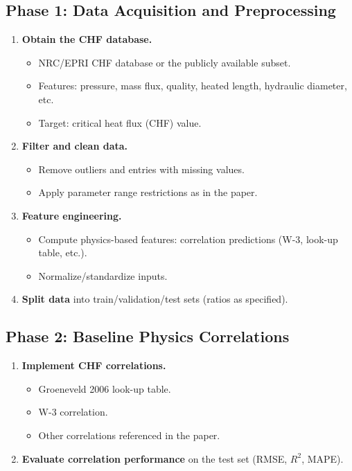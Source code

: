 \documentclass[11pt,a4paper]{article}
\begin{document}
\subsection{Phase 1: Data Acquisition and Preprocessing}
\begin{enumerate}[label=\textbf{1.\arabic*}]
  \item \textbf{Obtain the CHF database.}
    \begin{itemize}
      \item NRC/EPRI CHF database or the publicly available subset.
      \item Features: pressure, mass flux, quality, heated length, hydraulic diameter, etc.
      \item Target: critical heat flux (CHF) value.
    \end{itemize}
  \item \textbf{Filter and clean data.}
    \begin{itemize}
      \item Remove outliers and entries with missing values.
      \item Apply parameter range restrictions as in the paper.
    \end{itemize}
  \item \textbf{Feature engineering.}
    \begin{itemize}
      \item Compute physics-based features: correlation predictions (W-3, look-up table, etc.).
      \item Normalize/standardize inputs.
    \end{itemize}
  \item \textbf{Split data} into train/validation/test sets (ratios as specified).
\end{enumerate}

\subsection{Phase 2: Baseline Physics Correlations}
\begin{enumerate}[label=\textbf{2.\arabic*}]
  \item \textbf{Implement CHF correlations.}
    \begin{itemize}
      \item Groeneveld 2006 look-up table.
      \item W-3 correlation.
      \item Other correlations referenced in the paper.
    \end{itemize}
  \item \textbf{Evaluate correlation performance} on the test set (RMSE, $R^2$, MAPE).
\end{enumerate}
\end{document}
